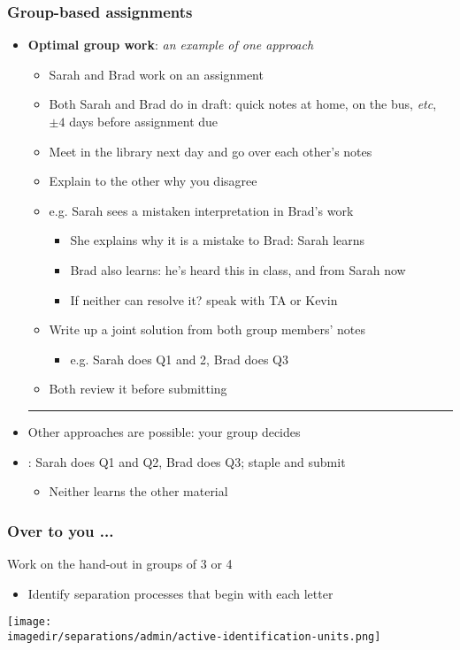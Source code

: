 \begin{frame}\frametitle{Group-based assignments}
	\begin{itemize}
		\item	\textbf{Optimal group work}: \emph{an example of one approach}
			\begin{itemize}
				\item	Sarah and Brad work on an assignment
				\item	Both Sarah and Brad do {} in draft: quick notes at home, on the bus, \emph{etc}, $\pm 4$ days before assignment due
				\pause
				\item	Meet in the library next day and go over each other's notes
				\item	Explain to the other why you disagree
				\item	e.g. Sarah sees a mistaken interpretation in Brad's work
				\begin{itemize}
					\item	She explains why it is a mistake to Brad: Sarah learns
					\item	Brad also learns: he's heard this in class, and from Sarah now
					\item	If neither can resolve it? speak with TA or Kevin
				\end{itemize}
				\pause
				\item	Write up a joint solution from both group members' notes
				\begin{itemize}
					\item	e.g. Sarah does Q1 and 2, Brad does Q3
				\end{itemize}
				\item	Both review it before submitting
			\end{itemize}
		\vspace{2pt}\hrule\vspace{2pt}
		\pause
		\item	Other approaches are possible: your group decides
		\item	{\color{myOrange}{What doesn't work}:} Sarah does Q1 and Q2, Brad does Q3; staple and submit
		\begin{itemize}
			\item	Neither learns the other material
		\end{itemize}
	\end{itemize}
\end{frame}

\begin{frame}\frametitle{Over to you ...}
	Work on the hand-out in groups of 3 or 4
	\begin{itemize}
		\item	Identify separation processes that begin with each letter
	\end{itemize}
	\begin{center}
		\texttt{[image: \\imagedir/separations/admin/active-identification-units.png]}
	\end{center}
\end{frame}

